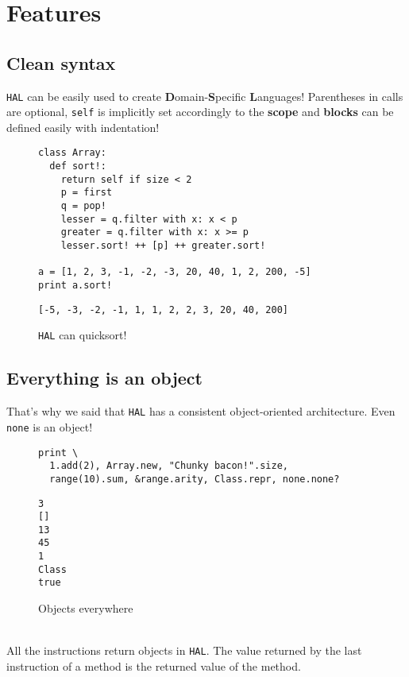 \documentclass[a4paper,11pt]{article}
\begin{document}
\section{Features}
\subsection{Clean syntax}
\texttt{HAL} can be easily used to create \textbf{D}omain-\textbf{S}pecific \textbf{L}anguages! Parentheses in calls are optional, \texttt{self}
  is implicitly set accordingly to the \textbf{scope} and \textbf{blocks} can be defined easily with indentation!
\begin{figure}[h!]
\begin{lstlisting}[language=hal]
class Array:
  def sort!:
    return self if size < 2
    p = first
    q = pop!
    lesser = q.filter with x: x < p
    greater = q.filter with x: x >= p
    lesser.sort! ++ [p] ++ greater.sort!

a = [1, 2, 3, -1, -2, -3, 20, 40, 1, 2, 200, -5]
print a.sort!
\end{lstlisting}
\begin{lstlisting}[language=output]
[-5, -3, -2, -1, 1, 1, 2, 2, 3, 20, 40, 200]
\end{lstlisting}
\caption{\texttt{HAL} can quicksort!}
\label{quicksort}
\end{figure}
\subsection{Everything is an object}
That's why we said that \texttt{HAL} has a consistent object-oriented architecture. Even \texttt{none} is an object!
\begin{figure}[h!]
\begin{lstlisting}[language=hal]
print \
  1.add(2), Array.new, "Chunky bacon!".size,
  range(10).sum, &range.arity, Class.repr, none.none?
\end{lstlisting}
\begin{lstlisting}[language=output]
3
[]
13
45
1
Class
true
\end{lstlisting}
\caption{Objects everywhere}
\label{objects}
\end{figure}
\\
All the instructions return objects in \texttt{HAL}. The value returned by the last instruction of a method
  is the returned value of the method.
\end{document}
